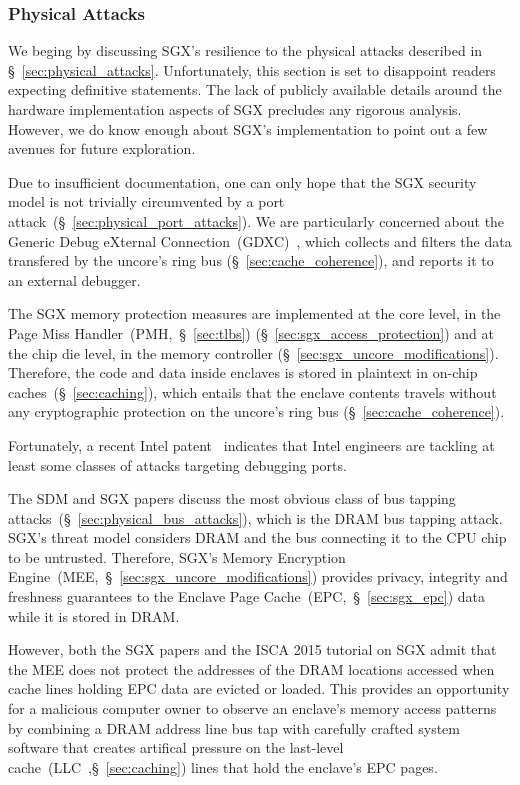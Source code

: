 \subsubsection{Physical Attacks}
\label{sec:sgx_vs_physical_attacks}

We beging by discussing SGX's resilience to the physical attacks described in
\S~\ref{sec:physical_attacks}. Unfortunately, this section is set to disappoint
readers expecting definitive statements. The lack of publicly available details
around the hardware implementation aspects of SGX precludes any rigorous
analysis. However, we do know enough about SGX's implementation to point out a
few avenues for future exploration.

Due to insufficient documentation, one can only hope that the SGX security
model is not trivially circumvented by a port
attack~(\S~\ref{sec:physical_port_attacks}). We are particularly concerned
about the Generic Debug eXternal
Connection~(GDXC)~\cite{yuffe2011sandybridge, intel2011gdxc}, which collects
and filters the data transfered by the uncore's ring bus
(\S~\ref{sec:cache_coherence}), and reports it to an external debugger.

The SGX memory protection measures are implemented at the core level, in the
Page Miss Handler~(PMH,~\S~\ref{sec:tlbs}) (\S~\ref{sec:sgx_access_protection})
and at the chip die level, in the memory controller
(\S~\ref{sec:sgx_uncore_modifications}). Therefore, the code and data inside
enclaves is stored in plaintext in on-chip caches~(\S~\ref{sec:caching}), which
entails that the enclave contents travels without any cryptographic protection
on the uncore's ring bus (\S~\ref{sec:cache_coherence}).

Fortunately, a recent Intel patent~\cite{shanbhogue2015gdxcsgx} indicates that
Intel engineers are tackling at least some classes of attacks targeting
debugging ports.

The SDM and SGX papers discuss the most obvious class of bus tapping
attacks~(\S~\ref{sec:physical_bus_attacks}), which is the DRAM bus tapping
attack. SGX's threat model considers DRAM and the bus connecting it to the CPU
chip to be untrusted. Therefore, SGX's Memory Encryption
Engine~(MEE,~\S~\ref{sec:sgx_uncore_modifications}) provides privacy, integrity
and freshness guarantees to the Enclave Page Cache~(EPC,~\S~\ref{sec:sgx_epc})
data while it is stored in DRAM.

However, both the SGX papers and the ISCA 2015 tutorial on SGX admit that the
MEE does not protect the addresses of the DRAM locations accessed when cache
lines holding EPC data are evicted or loaded. This provides an opportunity for
a malicious computer owner to observe an enclave's memory access patterns by
combining a DRAM address line bus tap with carefully crafted system software
that creates artifical pressure on the last-level
cache~(LLC~,\S~\ref{sec:caching}) lines that hold the enclave's EPC pages.

